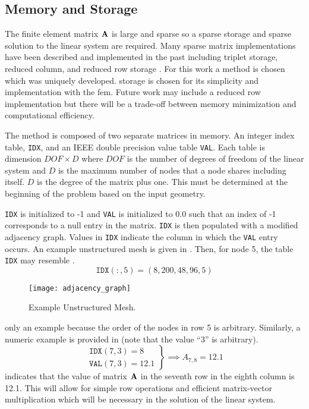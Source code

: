   \subsection{Memory and Storage}
    The finite element matrix $\mathbf{A}$ is large and sparse so a sparse storage and
    sparse solution to the linear system are required. Many sparse matrix 
    implementations have been described and implemented in the past including
    triplet storage, reduced column, and reduced row storage \cite{sparseBLAS}.
    For this work a \twotable method is chosen which was uniquely 
    developed. \twotable storage is chosen for its simplicity and implementation
    with the \gls{fem}. Future work may include a reduced row implementation but 
    there will be a trade-off between memory minimization and computational 
    efficiency.
    
    The \twotable method is composed of two separate matrices in memory. An 
    integer index table, \texttt{IDX}, and an IEEE double precision value table
    \texttt{VAL}. Each table is dimension $DOF \times D$ where $DOF$ is the
    number of degrees of freedom of the linear system and $D$ is the maximum
    number of nodes that a node shares including itself. $D$ is the degree of
    the matrix plus one. This must be determined at the beginning of the
    problem based on the input geometry.
    
    \texttt{IDX} is initialized to -1 and \texttt{VAL} is initialized 
    to 0.0 such that an index of -1 corresponds to a null entry in the 
    matrix. \texttt{IDX} is then populated with a modified adjacency graph. 
    Values in \texttt{IDX} indicate the column in which the \texttt{VAL} entry
    occurs. An example unstructured mesh is given in . 
    Then, for node 5, the table \texttt{IDX} may resemble .
    \begin{equation}
      \label{eq:idx_example}
      \texttt{IDX}(:,5) = (8, 200, 48, 96, 5 )
    \end{equation}
    \begin{figure}
      \centering
      \texttt{[image: adjacency\_graph]}
      \caption{Example Unstructured Mesh.}
      \label{fig:adjacency_graph}
    \end{figure}
     only an example because the order of the nodes in row
    5 is arbitrary. Similarly, a numeric example is provided in 
     (note that the value ``3'' is arbitrary).
    \begin{equation}
      \label{eq:idx_number}
      \left.
      \begin{array}{c}
        \texttt{IDX}(7,3) = 8 \\
        \texttt{VAL}(7,3) = 12.1
      \end{array}
      \right\}
      \implies
      A_{7,8} = 12.1
    \end{equation}
     indicates that the value of matrix $\mathbf{A}$ in the
    seventh row in the eighth column is 12.1. This will allow for simple row 
    operations and efficient matrix-vector multiplication which will be 
    necessary in the solution of the linear system.

